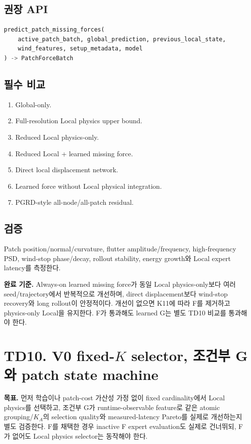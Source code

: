 \documentclass[10pt,a4paper]{article}
\begin{document}
\subsection*{권장 API}

\begin{lstlisting}[language=Python]
predict_patch_missing_forces(
    active_patch_batch, global_prediction, previous_local_state,
    wind_features, setup_metadata, model
) -> PatchForceBatch
\end{lstlisting}

\subsection*{필수 비교}

\begin{enumerate}
  \item Global-only.
  \item Full-resolution Local physics upper bound.
  \item Reduced Local physics-only.
  \item Reduced Local + learned missing force.
  \item Direct local displacement network.
  \item Learned force without Local physical integration.
  \item PGRD-style all-node/all-patch residual.
\end{enumerate}

\subsection*{검증}

Patch position/normal/curvature, flutter amplitude/frequency, high-frequency PSD,
wind-stop phase/decay, rollout stability, energy growth와 Local expert latency를 측정한다.

\textbf{완료 기준.}
Always-on learned missing force가 동일 Local physics-only보다 여러 seed/trajectory에서 반복적으로 개선하며,
direct displacement보다 wind-stop recovery와 long rollout이 안정적이다.
개선이 없으면 K11에 따라 F를 제거하고 physics-only Local을 유지한다.
F가 통과해도 learned G는 별도 TD10 비교를 통과해야 한다.

\section{TD10. V0 fixed-\(K\) selector, 조건부 G와 patch state machine}

\textbf{목표.}
먼저 학습이나 patch-cost 가산성 가정 없이 fixed cardinality에서 Local physics를 선택하고,
조건부 G가 runtime-observable feature로 같은 atomic grouping/\(K_A\)의 selection quality와
measured-latency Pareto를 실제로 개선하는지 별도 검증한다.
F를 채택한 경우 inactive F expert evaluation도 실제로 건너뛰되, F가 없어도 Local physics selector는 동작해야 한다.
\end{document}
